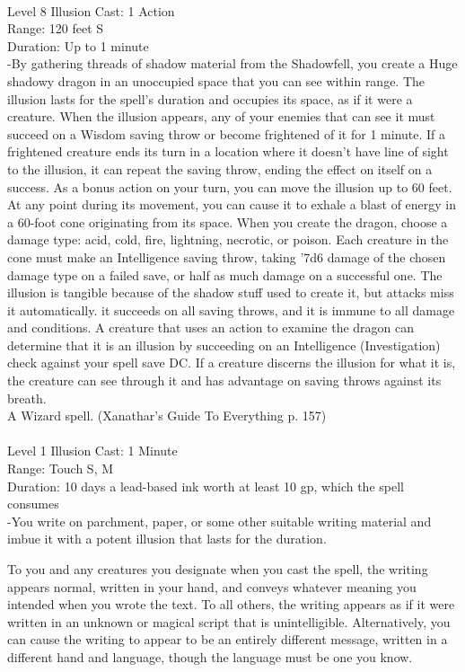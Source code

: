 \documentclass[10pt,twocolumn]{report}
\begin{document}
 \\
Level 8 \quad Illusion \quad Cast: 1 Action\\
Range: 120 feet \quad S\\
Duration: Up to 1 minute \quad \\
-By gathering threads of shadow material from the Shadowfell, you create a Huge shadowy dragon in an unoccupied space that you can see within range. The illusion lasts for the spell’s duration and occupies its space, as if it were a creature.
When the illusion appears, any of your enemies that can see it must succeed on a Wisdom saving throw or become frightened of it for 1 minute. If a frightened creature ends its turn in a location where it doesn’t have line of sight to the illusion, it can repeat the saving throw, ending the effect on itself on a success.
As a bonus action on your turn, you can move the illusion up to 60 feet. At any point during its movement, you can cause it to exhale a blast of energy in a 60-foot cone originating from its space. When you create the dragon, choose a damage type: acid, cold, fire, lightning, necrotic, or poison. Each creature in the cone must make an Intelligence saving throw, taking '7d6 damage of the
chosen damage type on a failed save, or half as much damage on a successful one.
The illusion is tangible because of the shadow stuff used to create it, but attacks miss it automatically. it succeeds on all saving throws, and it is immune to all damage and conditions. A creature that uses an action to examine the dragon can determine that it is an illusion by succeeding on an Intelligence (Investigation) check against your spell save DC. If a creature discerns the illusion for what it is, the creature can see through it and has advantage on saving throws against its breath.\\
A Wizard spell. (Xanathar's Guide To Everything p. 157) \\


 \\
Level 1 \quad Illusion \quad Cast: 1 Minute\\
Range: Touch \quad S, M\\
Duration: 10 days \quad a lead-based ink worth at least 10 gp, which the spell consumes\\
-You write on parchment, paper, or some other suitable writing material and imbue it with a potent illusion that lasts for the duration.

To you and any creatures you designate when you cast the spell, the writing appears normal, written in your hand, and conveys whatever meaning you intended when you wrote the text. To all others, the writing appears as if it were written in an unknown or magical script that is unintelligible. Alternatively, you can cause the writing to appear to be an entirely different message, written in a different hand and language, though the language must be one you know.
\end{document}
